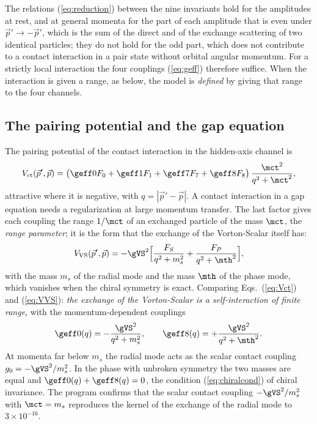 The relations (\ref{eq:reduction}) between the nine invariants hold for the amplitudes at rest, and at
general momenta for the part of each amplitude that is even under $\vec p'\to-\vec p'$, which is the
sum of the direct and of the exchange scattering of two identical particles; they do not hold for
the odd part, which does not contribute to a contact interaction in a pair state without orbital
angular momentum. For a strictly local interaction the four couplings (\ref{eq:geff}) therefore
suffice. When the interaction is given a range, as below, the model is \emph{defined} by giving that
range to the four channels.

\subsection{The pairing potential and the gap equation}

The pairing potential of the contact interaction in the hidden-axis channel is
\begin{equation}
V_{\mathrm{ct}}(\vec p',\vec p)=\big(\geff0F_0+\geff1F_1+\geff7F_7+\geff8F_8\big)\,\frac{\mct^{2}}{q^{2}+\mct^{2}},
\label{eq:Vct}
\end{equation}
attractive where it is negative, with $q=|\vec p'-\vec p|$. A contact interaction in a gap equation
needs a regularization at large momentum transfer. The last factor gives each coupling the range
$1/\mct$ of an exchanged particle of the mass $\mct$, the \emph{range parameter}; it is the form that
the exchange of the Vorton-Scalar itself has:
\begin{equation}
V_{\mathrm{VS}}(\vec p',\vec p)=-\gVS^{2}\Big[\frac{F_S}{q^{2}+m_s^{2}}+\frac{F_P}{q^{2}+\mth^{2}}\Big],
\label{eq:VVS}
\end{equation}
with the mass $m_s$ of the radial mode and the mass $\mth$ of the phase mode, which vanishes when the
chiral symmetry is exact. Comparing Eqs.~(\ref{eq:Vct}) and (\ref{eq:VVS}): \emph{the exchange of the
Vorton-Scalar is a self-interaction of finite range}, with the momentum-dependent couplings
\begin{equation}
\geff0(q)=-\frac{\gVS^{2}}{q^{2}+m_s^{2}},\qquad\geff8(q)=+\frac{\gVS^{2}}{q^{2}+\mth^{2}} .
\label{eq:gq_exchange}
\end{equation}
At momenta far below $m_s$ the radial mode acts as the scalar contact coupling
$g_0=-\gVS^{2}/m_s^{2}$. In the phase with unbroken symmetry the two masses are equal and
$\geff0(q)+\geff8(q)=0$, the condition (\ref{eq:chiralcond}) of chiral invariance. The program confirms
that the scalar contact coupling $-\gVS^{2}/m_s^{2}$ with $\mct=m_s$ reproduces the kernel of the
exchange of the radial mode to $3\times10^{-16}$.

